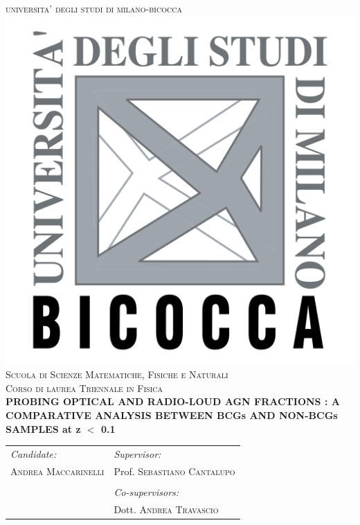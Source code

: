 \documentclass[12pt,a4paper]{article}
\begin{document}
\begin{titlepage}

\newcommand{\HRule}{\rule{\linewidth}{0.5mm}} %

\center %
 
{ 
\textsc{\LARGE universita' degli studi di milano-bicocca}\\[1cm] %
}
\includegraphics[width = .25\textwidth]{logo_unimib.png}\\[1cm] %
\textsc{\Large Scuola di Scienze Matematiche, Fisiche e Naturali }\\[0.25cm] %
\textsc{\large Corso di laurea Triennale in Fisica}\\[0.75cm] %


\vspace{1.5cm}
{ 
{\bfseries PROBING OPTICAL AND RADIO-LOUD AGN FRACTIONS : A COMPARATIVE ANALYSIS BETWEEN BCGs AND NON-BCGs SAMPLES at z $<$ 0.1 }\\[0.4cm] %
}
\vspace{3cm}
 
\begin{table}[htb!]
\centering
\begin{tabularx}{\textwidth}{X X}
\emph{Candidate:} & \emph{Supervisor:} \\
\textsc{Andrea Maccarinelli} & Prof. \textsc{Sebastiano Cantalupo}  \\
& \\
& \emph{Co-supervisors:} \\
& Dott. \textsc{Andrea Travascio} \\
\end{tabularx}
\end{table}


\end{titlepage}
\end{document}
